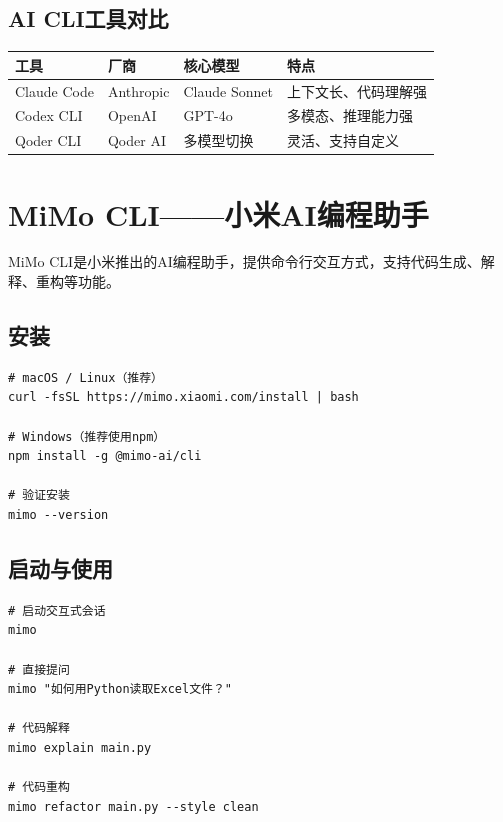 \subsection{AI CLI工具对比}

\begin{table}[H]
\centering
\begin{tabular}{llll}
\toprule
\textbf{工具} & \textbf{厂商} & \textbf{核心模型} & \textbf{特点} \\
\midrule
Claude Code & Anthropic & Claude Sonnet & 上下文长、代码理解强 \\
Codex CLI & OpenAI & GPT-4o & 多模态、推理能力强 \\
Qoder CLI & Qoder AI & 多模型切换 & 灵活、支持自定义 \\
\bottomrule
\end{tabular}
\end{table}

\section{MiMo CLI——小米AI编程助手}

MiMo CLI是小米推出的AI编程助手，提供命令行交互方式，支持代码生成、解释、重构等功能。

\subsection{安装}

\begin{lstlisting}[style=shell]
# macOS / Linux（推荐）
curl -fsSL https://mimo.xiaomi.com/install | bash

# Windows（推荐使用npm）
npm install -g @mimo-ai/cli

# 验证安装
mimo --version
\end{lstlisting}

\subsection{启动与使用}

\begin{lstlisting}[style=shell]
# 启动交互式会话
mimo

# 直接提问
mimo "如何用Python读取Excel文件？"

# 代码解释
mimo explain main.py

# 代码重构
mimo refactor main.py --style clean
\end{lstlisting}

